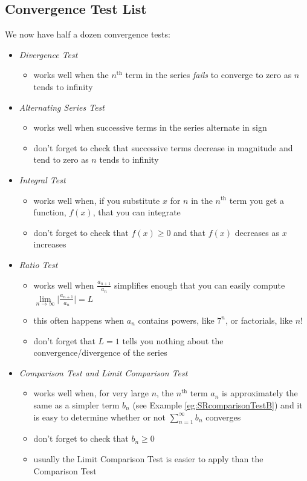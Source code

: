 \subsection{Convergence Test List}
We now have half a dozen convergence tests:
\begin{itemize}
\item
\emph{Divergence Test}
\begin{itemize}
\item
works well when the $n^{\mathrm{th}}$ term in the series \emph{fails}
to converge to zero as $n$ tends to infinity
\end{itemize}
\item
\emph{Alternating Series Test}
\begin{itemize}
\item
works well when successive terms in the series alternate
in sign
\item
don't forget to check that successive terms decrease in magnitude
and tend to zero as $n$  tends to infinity
\end{itemize}
\item
\emph{Integral Test}
\begin{itemize}
\item
works well when, if you substitute $x$ for $n$ in the $n^{\mathrm{th}}$ term
you get a function, $f(x)$, that you can integrate
\item
don't forget to check that $f(x)\ge 0$ and that $f(x)$ decreases
as $x$ increases
\end{itemize}

\item
\emph{Ratio Test}
\begin{itemize}
\item
works well when $\frac{a_{n+1}}{a_n}$ simplifies enough that
you can easily compute
$\lim\limits_{n\rightarrow\infty}\big|\frac{a_{n+1}}{a_n}\big|=L$
\item
this often happens when $a_n$ contains powers, like $7^n$,
or factorials, like $n!$
\item
don't forget that $L=1$ tells you nothing about the convergence/divergence
of the series
\end{itemize}

\item
\emph{Comparison Test and Limit Comparison Test}
\begin{itemize}
\item
works well when, for very large $n$, the $n^{\mathrm{th}}$ term
$a_n$ is approximately the same as a simpler term $b_n$ (see Example
\ref{eg:SRcomparisonTestB}) and it is easy to determine whether
or not $\sum_{n=1}^\infty b_n$ converges
\item
don't forget to check that $b_n\ge 0$
\item usually the Limit Comparison Test is easier to apply
than the Comparison Test
\end{itemize}

\end{itemize}

